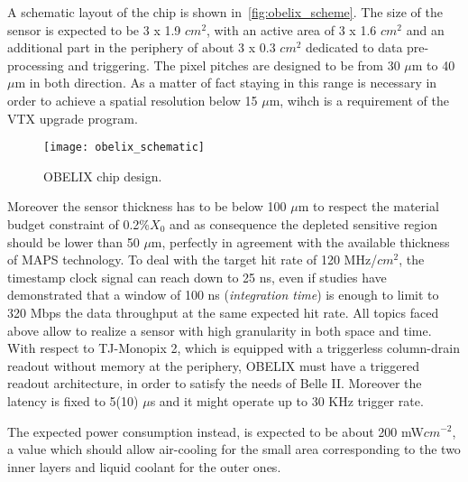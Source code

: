 A schematic layout of the chip is shown in~\autoref{fig:obelix_scheme}. The size of the sensor is expected to be 3 x 1.9 $cm^{2}$, with an active area of 3 x 1.6 $cm^{2}$ and an additional part in the periphery of about 3 x 0.3 $cm^{2}$ dedicated to data pre-processing and triggering. The pixel pitches are designed to be from 30 $\mu$m to 40 $\mu$m in both direction. As a matter of fact staying in this range is necessary in order to achieve a spatial resolution below 15 $\mu$m, wihch is a requirement of the VTX upgrade program.


\begin{figure}[h!]
\centering
\texttt{[image: obelix\_schematic]}
\caption{OBELIX chip design.}
\label{fig:obelix_scheme}
\end{figure}

Moreover the sensor thickness has to be below 100 $\mu$m to respect the material budget constraint of 0.2\%$X_{0}$ and as consequence the depleted sensitive region should be lower than 50 $\mu$m, perfectly in agreement with the available thickness of MAPS  technology. 
To deal with the target hit rate of 120 MHz/$cm^{2}$, the timestamp clock signal can reach down to 25 ns, even if studies have demonstrated that a window of 100 ns (\textit{integration time}) is enough to limit to 320 Mbps the data throughput at the same expected hit rate. 
All topics faced above allow to realize a sensor with high granularity in both space and time.\\

With respect to TJ-Monopix 2, which is equipped with a triggerless column-drain readout without memory at the periphery, OBELIX must have a triggered readout architecture, in order to satisfy the needs of Belle II. Moreover the latency is fixed to 5(10) $\mu$s and it might operate up to 30 KHz trigger rate.

The expected power consumption instead, is expected to be about 200 mW$cm^{-2}$, a value which should allow air-cooling for the small area corresponding to the two inner layers and liquid coolant for the outer ones. 


\begin{comment}
Tolerance to Total Ionizing Dose (TID) and Non Ionizing Energy Loss (NIEL)
fluence have been discussed already. But Single Event Effects (SEE) generated
by radiation might affect the sensor. Since no latchup (SEL) were observed in the
past operation years of Belle II, no specification is given. However Single Event
Upset (SEU) were observed and will be a concern to some extent, but are not yet
35 quantified. Consequently, the first specification is to ensure that the control system
allows resetting the sensor registers to the operational values at least every
few minutes. The actual frequency will be chosen after the measurement of the
SEU cross section with the OBELIX sensor and the comparison to the occurrence
distribution of large energy loss in the experiment.
\end{comment}

